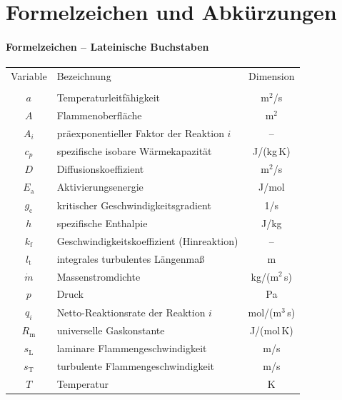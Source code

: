 \chapter{Formelzeichen und Abkürzungen}\label{chapter:symbols}


\subsubsection{Formelzeichen -- Lateinische Buchstaben}

\begin{tabularx}{\textwidth}{cXc}
Variable & Bezeichnung & Dimension \\ \\
  $a$              & Temperaturleitfähigkeit                & m$^2$/s \\
  $A$              & Flammenoberfläche                      & m$^2$ \\
  $A_i$            & präexponentieller Faktor der Reaktion $i$ & -- \\
  $c_p$            & spezifische isobare Wärmekapazität     & J/(kg\,K) \\
  $D$              & Diffusionskoeffizient                  & m$^2$/s \\
  $E_\mathrm{a}$   & Aktivierungsenergie                    & J/mol \\
  $g_\mathrm{c}$   & kritischer Geschwindigkeitsgradient    & 1/s \\
  $h$              & spezifische Enthalpie                  & J/kg \\
  $k_\mathrm{f}$   & Geschwindigkeitskoeffizient (Hinreaktion) & -- \\
  $l_\mathrm{t}$   & integrales turbulentes Längenmaß       & m \\
  $\dot{m}$        & Massenstromdichte                      & kg/(m$^2$\,s) \\
  $p$              & Druck                                  & Pa \\
  $q_i$            & Netto-Reaktionsrate der Reaktion $i$   & mol/(m$^3$\,s) \\
  $R_\mathrm{m}$   & universelle Gaskonstante               & J/(mol\,K) \\
  $s_\mathrm{L}$   & laminare Flammengeschwindigkeit        & m/s \\
  $s_\mathrm{T}$   & turbulente Flammengeschwindigkeit      & m/s \\
  $T$              & Temperatur                             & K \\

\end{tabularx}
